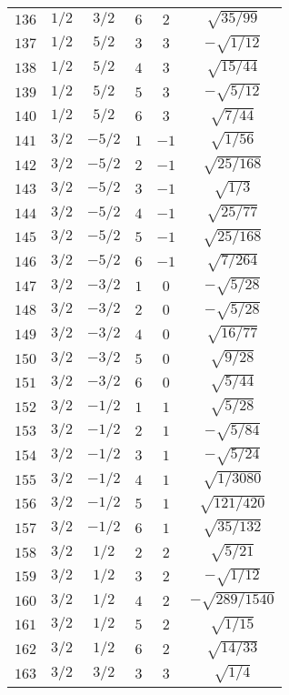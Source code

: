 \begin{table}
\begin{center}
\begin{tabular}{|c|c|c|c|c|c|}
$136$ & $1/2$ & $3/2$ & $6$ & $2$ & $\sqrt{35/99}$ \\ 
$137$ & $1/2$ & $5/2$ & $3$ & $3$ & $-\sqrt{1/12}$ \\ 
$138$ & $1/2$ & $5/2$ & $4$ & $3$ & $\sqrt{15/44}$ \\ 
$139$ & $1/2$ & $5/2$ & $5$ & $3$ & $-\sqrt{5/12}$ \\ 
$140$ & $1/2$ & $5/2$ & $6$ & $3$ & $\sqrt{7/44}$ \\ 
$141$ & $3/2$ & $-5/2$ & $1$ & $-1$ & $\sqrt{1/56}$ \\ 
$142$ & $3/2$ & $-5/2$ & $2$ & $-1$ & $\sqrt{25/168}$ \\ 
$143$ & $3/2$ & $-5/2$ & $3$ & $-1$ & $\sqrt{1/3}$ \\ 
$144$ & $3/2$ & $-5/2$ & $4$ & $-1$ & $\sqrt{25/77}$ \\ 
$145$ & $3/2$ & $-5/2$ & $5$ & $-1$ & $\sqrt{25/168}$ \\ 
$146$ & $3/2$ & $-5/2$ & $6$ & $-1$ & $\sqrt{7/264}$ \\ 
$147$ & $3/2$ & $-3/2$ & $1$ & $0$ & $-\sqrt{5/28}$ \\ 
$148$ & $3/2$ & $-3/2$ & $2$ & $0$ & $-\sqrt{5/28}$ \\ 
$149$ & $3/2$ & $-3/2$ & $4$ & $0$ & $\sqrt{16/77}$ \\ 
$150$ & $3/2$ & $-3/2$ & $5$ & $0$ & $\sqrt{9/28}$ \\ 
$151$ & $3/2$ & $-3/2$ & $6$ & $0$ & $\sqrt{5/44}$ \\ 
$152$ & $3/2$ & $-1/2$ & $1$ & $1$ & $\sqrt{5/28}$ \\ 
$153$ & $3/2$ & $-1/2$ & $2$ & $1$ & $-\sqrt{5/84}$ \\ 
$154$ & $3/2$ & $-1/2$ & $3$ & $1$ & $-\sqrt{5/24}$ \\ 
$155$ & $3/2$ & $-1/2$ & $4$ & $1$ & $\sqrt{1/3080}$ \\ 
$156$ & $3/2$ & $-1/2$ & $5$ & $1$ & $\sqrt{121/420}$ \\ 
$157$ & $3/2$ & $-1/2$ & $6$ & $1$ & $\sqrt{35/132}$ \\ 
$158$ & $3/2$ & $1/2$ & $2$ & $2$ & $\sqrt{5/21}$ \\ 
$159$ & $3/2$ & $1/2$ & $3$ & $2$ & $-\sqrt{1/12}$ \\ 
$160$ & $3/2$ & $1/2$ & $4$ & $2$ & $-\sqrt{289/1540}$ \\ 
$161$ & $3/2$ & $1/2$ & $5$ & $2$ & $\sqrt{1/15}$ \\ 
$162$ & $3/2$ & $1/2$ & $6$ & $2$ & $\sqrt{14/33}$ \\ 
$163$ & $3/2$ & $3/2$ & $3$ & $3$ & $\sqrt{1/4}$ \\ 

\end{tabular}
\end{center}
\end{table}
